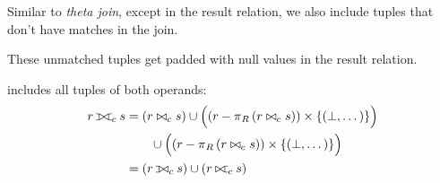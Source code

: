 \begin{multicols}{2}
\begin{CheatsheetEntryFrame}
        \newcommand{\RelAlgVennDiagram}[3]{%
            \begin{tikzpicture}[scale=0.4, transform shape]
                \begin{scope} %
                    \clip
                        (-1, -1) rectangle (2.2, 1)
                        (1.2, 0) circle (1)
                    ;
                    \fill[#1] (0, 0) circle (1);
                \end{scope}
                \begin{scope} %
                    \clip (1.2, 0) circle (1);
                    \fill[#2] (0, 0) circle (1);
                \end{scope}
                \begin{scope} %
                    \clip
                        (-1, -1) rectangle (2.2, 1)
                        (0, 0) circle (1)
                    ;
                    \fill[#3] (1.2, 0) circle (1);
                \end{scope}
                \begin{scope} %
                    \draw[line width=2.0pt]
                        (1.2, 0) circle (1)
                        (0, 0) circle (1)
                    ;
                \end{scope}
            \end{tikzpicture}%
        }

         \MarkExtendedRelAlg

        Similar to \textit{theta join}, except in the result relation, we also include tuples that don't have matches in the join.

        These unmatched tuples get padded with null values in the result relation.


        \vspace{\TextExtraSkip}%
        \textit{} includes all tuples of both operands:
        \begin{align*}
            r \relfullouterjoin_c s &=
                (r \bowtie_c s)
                \cup \parens*{\vphantom{\frac{x}{x}}
                    \parens*{r - \relproject_R{(r \bowtie_c s)}}
                    \times \braces*{(\relnullvalue, \dots)}
                } \\
            &
                \qquad
                \cup \parens*{\vphantom{\frac{x}{x}}
                    \parens*{r - \relproject_R{(r \bowtie_c s)}}
                    \times \braces*{(\relnullvalue, \dots)}
                } \\
            &= (r \relleftouterjoin_c s) \cup (r \relrightouterjoin_c s)
        \end{align*}


\end{CheatsheetEntryFrame}
\end{multicols}
